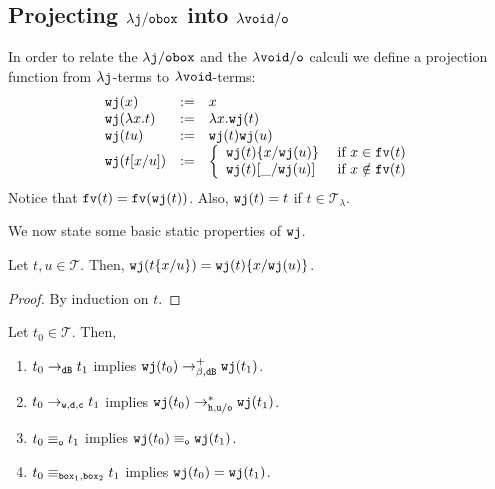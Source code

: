 \documentclass{LMCS}
\renewcommand{\>}{\rightarrow}
\def\lam{\lambda}
\newcommand{\Rew}[1]{\rightarrow_{#1}}
\newcommand{\Rewnmod}[2]{\rightarrow^*_{#1/#2}}
\newcommand{\isubs}[1]{ \{ #1  \} }
\newcommand{\B}{{\tt dB}}
\newcommand{\dis}{{\tt j}}
\newcommand{\ldis}{\lam{\dis}}
\newcommand{\Rewplus}[1]{\rightarrow^{+}_{#1}}
\newcommand{\fv}[1]{{\tt fv}(#1)}
\newcommand{\proj}{\wfc}
\newcommand{\Var}{{\tt d}}
\newcommand{\DSubs}{{\tt c}}
\newcommand{\Gc}{{\tt w}}
\newcommand{\terms}{\mathcal{T}}
\newcommand{\termslambda}{\terms_{\lam}}
\newcommand{\wfc}{\Gc\dis}
\newcommand{\unboxed}{{\tt u}}
\newcommand{\modulo}[2]{#1/#2}
\newcommand{\eqo}{\equiv_\osym}
\newcommand{\osym}{{\tt o}}
\newcommand{\ldisf}{\lam \modulo{\dis}{\fsymb}}
\newcommand{\fsymb}{\osymb\boite}
\newcommand{\osymb}{{\tt o}}
\newcommand{\aux}{{\tt void}}
\newcommand{\laux}{\lam\aux}
\newcommand{\lauxm}{\lam\modulo{ \aux }{ \osymb }}
\newcommand{\New}{{\tt h}}
\newcommand{\boite}{{\tt box}}
\newcommand{\sigt}{\boite_1}
\newcommand{\sigq}{\boite_2}
\newcommand{\void}{\_}
\begin{document}
\subsection{Projecting  $\ldisf$ into $\lauxm$}
\label{s:projection}

In order to relate the $\ldisf$ and the $\lauxm$ calculi 
we define a projection function from $\ldis$-terms to $\laux$-terms:
\[ \begin{array}{lll}
   \proj(x)      & := & x \\
   \proj(\lam x.t) & := & \lam x.\proj(t) \\
   \proj(tu)     & := & \proj(t)\proj(u)  \\
   \proj(t[x/u]) & := & \left \{ \begin{array}{ll}
                        \proj(t) \isubs{x/\proj(u)} & \mbox{ if } x \in \fv{t} \\
                        \proj(t) [\void/\proj(u)] & \mbox{ if } x \notin \fv{t} \\
                        \end{array} \right . \\
   \end{array} \]
Notice that $\fv{t} = \fv{\proj(t)}$. Also, $\proj(t) = t$ if $t \in \termslambda$. 


We now state some basic static properties of $\proj$.


\begin{lem}
\label{l:basic-properties-proj} Let $t,u \in \terms$. Then, 
$\proj(t\isubs{x/u}) = \proj(t)\isubs{x/\proj(u)}$.
\end{lem}

\begin{proof}
By induction on $t$.
\end{proof}



\begin{lem}[Projection]
\label{l:projection}
Let $t_0 \in \terms$. Then, 
\begin{enumerate}[\rm(1)]
\item \label{ppp-i} $t_0 \Rew{\B} t_1$ implies $\proj(t_0) \Rewplus{\beta, \B} \proj(t_1)$.
\item\label{ppp-iii}  $t_0 \Rew{\Gc, \Var, \DSubs} t_1$ implies 
$\proj(t_0) \Rewnmod{\New, \unboxed}{\osym} \proj(t_1)$.
\item \label{ppp-iv} $t_0 \eqo t_1$ implies $\proj(t_0) \equiv_{\osym} \proj(t_1)$.
\item \label{ppp-v} $t_0 \equiv_{\sigt, \sigq} t_1$ implies $\proj(t_0) = \proj(t_1)$.
\end{enumerate}
\end{lem}
\end{document}

